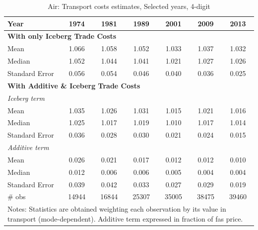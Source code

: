 \documentclass[a4paper,11pt]{article}
\begin{document}
\begin{table}[htbp]
  \centering
  \caption{Air: Transport costs estimates, Selected years, 4-digit}
\begin{center}
    \begin{tabular}{l|cccccc}
   \hline\hline
Year & 1974  & 1981  & 1989  & 2001  & 2009  & 2013 \\ \hline
\multicolumn{7}{l}{\textbf{With only Iceberg Trade Costs} }  \\
Mean  & 1.066 & 1.058 & 1.052 & \multicolumn{1}{c}{1.033} & \multicolumn{1}{c}{1.037} & \multicolumn{1}{c}{1.032} \\
Median & 1.052 & 1.044 & 1.041 & \multicolumn{1}{c}{1.021} & \multicolumn{1}{c}{1.027} & \multicolumn{1}{c}{1.026}  \\
Standard Error & 0.056 & 0.054 & 0.046 & \multicolumn{1}{c}{0.040} & \multicolumn{1}{c}{0.036} & \multicolumn{1}{c}{0.025}  \\
\hline
\multicolumn{7}{l}{\textbf{With Additive \& Iceberg Trade Costs }}  \\ \hline
\multicolumn{7}{l}{\textit{Iceberg term} }   \\ \hline
Mean  & 1.035 & 1.026 & 1.031 & \multicolumn{1}{c}{1.015} & \multicolumn{1}{c}{1.021} & \multicolumn{1}{c}{1.016}  \\
Median & 1.025 & 1.017 & 1.019 & \multicolumn{1}{c}{1.010} & \multicolumn{1}{c}{1.017} & \multicolumn{1}{c}{1.014}  \\
Standard Error & 0.036 & 0.028 & 0.030 & \multicolumn{1}{c}{0.021} & \multicolumn{1}{c}{0.024} & \multicolumn{1}{c}{0.015}  \\ \hline
\multicolumn{7}{l}{\textit{Additive term} }   \\ \hline
Mean  & 0.026 & 0.021 & 0.017 & \multicolumn{1}{c}{0.012} & \multicolumn{1}{c}{0.012} & \multicolumn{1}{c}{0.010} \\
Median & 0.012 & 0.006 & 0.006 & \multicolumn{1}{c}{0.005} & \multicolumn{1}{c}{0.004} & \multicolumn{1}{c}{0.004}  \\
Standard Error & 0.039 & 0.042 & 0.033 & \multicolumn{1}{c}{0.027} & \multicolumn{1}{c}{0.029} & \multicolumn{1}{c}{0.019} \\ \hline
\# obs & 14944 & 16844 & 25307 & \multicolumn{1}{c}{35005} & \multicolumn{1}{c}{38475} & \multicolumn{1}{c}{39460}  \\
\hline\hline
\multicolumn{7}{l}{\parbox[l]{11cm}{ \vspace{7pt}\scriptsize{Notes: Statistics are obtained weighting each observation by its value in transport (mode-dependent). Additive term expressed in fraction of fas price.}}}
\end{tabular}%
\end{center}
  \label{tab:result_air_rob}
\end{table}%
\end{document}
